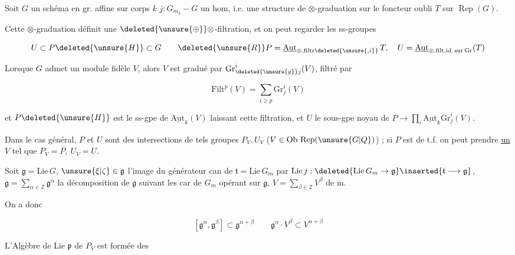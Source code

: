 
Soit $G$ un schéma en gr. affine sur corps $k$ $j:G_{m_k}-G$ un hom, i.e. une structure de $\otimes$-graduation sur le foncteur oubli $T$ sur $\operatorname{Rep}(G)$.

Cette $\otimes$-graduation définit une $\deleted{\unsure{\oplus}}\otimes$-filtration, et on peut regarder les ss-groupes

\[
U\subset P\deleted{\unsure{H}}\subset G\qquad
\deleted{\unsure{R}}P=\underline{\mathrm{Aut}}_{\otimes,\mathrm{filtr}\deleted{\unsure{,i}}}\,T,\quad
U=\underline{\mathrm{Aut}}_{\otimes,\mathrm{filt},\mathrm{id.\,sur\,Gr}}(T)
\]

Lorsque $G$  admet un module fidèle $V$,  alors $V$ est gradué par $\mathrm{Gr}_{\deleted{\unsure{g}}j}^i(V)$, filtré par

\[
\mathrm{Filt}^{p}(V)=\sum_{i\geq p}\mathrm{Gr}_j^i(V)
\]

et $P\deleted{\unsure{H}}$ est le ss-gpe de $\underline{\mathrm{Aut}}_k(V)$ laissant  cette filtration, et $U$ le sous-gpe noyau de $P\longrightarrow\prod_i\underline{\mathrm{Aut}}_k\mathrm{Gr}_{\underline{j}}^i(V)$.

Dans le cas général, $P$ et $U$ sont des intersections de tels groupes $P_V,U_V$ ($V\in\mathrm{Ob}\,\operatorname{Rep}(\unsure{G|Q})$) ; si $P$ est de t.f. on peut prendre \uline{un} $V$ tel que $P_V=P,\ U_V=U$.

 Soit $\mathfrak g=\mathrm{Lie}\,G$, $\unsure{\xi|\zeta}\in\mathfrak g$  l'image du générateur can de $\mathfrak t=\mathrm{Lie}\,G_m$ par $\mathrm{Lie}\,j:\deleted{\mathrm{Lie}\,G_m\to\mathfrak g}\inserted{\mathfrak t\longrightarrow\mathfrak g}$, $\mathfrak g=\sum_{\alpha\in\mathbb Z}\mathfrak g^\alpha$ la décomposition de $\mathfrak g$ suivant les car de $G_m$ opérant sur $\mathfrak g$, $V=\sum_{\beta\in\mathbb Z}V^\beta$ de $\overline{\mathrm m}$.

On a donc

\[
[\mathfrak g^\alpha,\mathfrak g^\beta]\subset\mathfrak g^{\alpha+\beta}
\qquad \mathfrak g^\alpha\cdot V^\beta\subset V^{\alpha+\beta}
\]

L'Algèbre de Lie $\mathfrak p$ de $P_V$ est formée des

